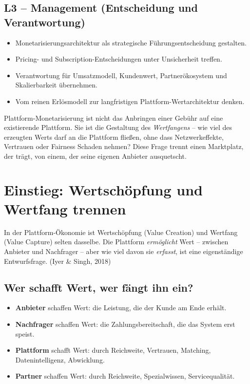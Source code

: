 \documentclass[11pt,a4paper,oneside]{article}
\newcommand{\fachbegriff}[1]{\textbf{#1}}
\newcommand{\quelle}[1]{{\footnotesize\color{lpGray}(#1)}}
\begin{document}
\subsection*{L3 -- Management (Entscheidung und Verantwortung)}
\begin{itemize}
  \item Monetarisierungsarchitektur als strategische Führungsentscheidung gestalten.
  \item Pricing- und Subscription-Entscheidungen unter Unsicherheit treffen.
  \item Verantwortung für Umsatzmodell, Kundenwert, Partnerökosystem und Skalierbarkeit übernehmen.
  \item Vom reinen Erlösmodell zur langfristigen Plattform-Wertarchitektur denken.
\end{itemize}

\begin{merkbox}
Plattform-Monetarisierung ist nicht das Anbringen einer Gebühr auf eine existierende Plattform. Sie ist die Gestaltung des \emph{Wertfangens} -- wie viel des erzeugten Werts darf an die Plattform fließen, ohne dass Netzwerkeffekte, Vertrauen oder Fairness Schaden nehmen? Diese Frage trennt einen Marktplatz, der trägt, von einem, der seine eigenen Anbieter ausquetscht.
\end{merkbox}

\clearpage

\section{Einstieg: Wertschöpfung und Wertfang trennen}

In der Plattform-Ökonomie ist Wertschöpfung (Value Creation) und Wertfang (Value Capture) selten dasselbe. Die Plattform \emph{ermöglicht} Wert -- zwischen Anbieter und Nachfrager -- aber wie viel davon sie \emph{erfasst}, ist eine eigenständige Entwurfsfrage. \quelle{Iyer \& Singh, 2018}

\subsection{Wer schafft Wert, wer fängt ihn ein?}

\begin{itemize}
  \item \fachbegriff{Anbieter} schaffen Wert: die Leistung, die der Kunde am Ende erhält.
  \item \fachbegriff{Nachfrager} schaffen Wert: die Zahlungsbereitschaft, die das System erst speist.
  \item \fachbegriff{Plattform} schafft Wert: durch Reichweite, Vertrauen, Matching, Datenintelligenz, Abwicklung.
  \item \fachbegriff{Partner} schaffen Wert: durch Reichweite, Spezialwissen, Servicequalität.
\end{itemize}
\end{document}
